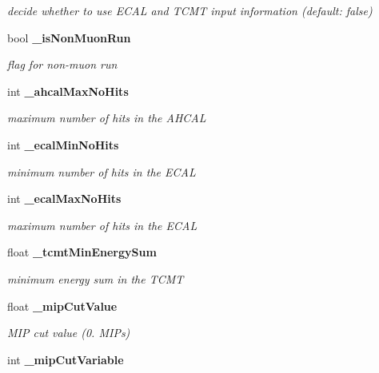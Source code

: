 \begin{DoxyCompactItemize}
\begin{DoxyCompactList}\small\item\em decide whether to use E\-C\-A\-L and T\-C\-M\-T input information (default\-: false) \end{DoxyCompactList}\item 
bool {\bf \-\_\-is\-Non\-Muon\-Run}\label{classCALICE_1_1MipTrackFinder_a9e36ce713512208024f7e677f24d70fb}

\begin{DoxyCompactList}\small\item\em flag for non-\/muon run \end{DoxyCompactList}\item 
int {\bf \-\_\-ahcal\-Max\-No\-Hits}\label{classCALICE_1_1MipTrackFinder_a91d061c42a10457d8e24b90cd298e634}

\begin{DoxyCompactList}\small\item\em maximum number of hits in the A\-H\-C\-A\-L \end{DoxyCompactList}\item 
int {\bf \-\_\-ecal\-Min\-No\-Hits}\label{classCALICE_1_1MipTrackFinder_aa7b08125cf046d630365de5f55cfbb6b}

\begin{DoxyCompactList}\small\item\em minimum number of hits in the E\-C\-A\-L \end{DoxyCompactList}\item 
int {\bf \-\_\-ecal\-Max\-No\-Hits}\label{classCALICE_1_1MipTrackFinder_ad02eebf5cf6fef77436863f907374423}

\begin{DoxyCompactList}\small\item\em maximum number of hits in the E\-C\-A\-L \end{DoxyCompactList}\item 
float {\bf \-\_\-tcmt\-Min\-Energy\-Sum}\label{classCALICE_1_1MipTrackFinder_af0a0a7decf81c16e7cfc8eab31e67a77}

\begin{DoxyCompactList}\small\item\em minimum energy sum in the T\-C\-M\-T \end{DoxyCompactList}\item 
float {\bf \-\_\-mip\-Cut\-Value}\label{classCALICE_1_1MipTrackFinder_a64adc19b661b41b9867c5c56f247778d}

\begin{DoxyCompactList}\small\item\em M\-I\-P cut value (0. M\-I\-Ps) \end{DoxyCompactList}\item 
int {\bfseries \-\_\-mip\-Cut\-Variable}\label{classCALICE_1_1MipTrackFinder_a19e45f827fa9c2b8f52ab7dc42fffd96}


\end{DoxyCompactItemize}
